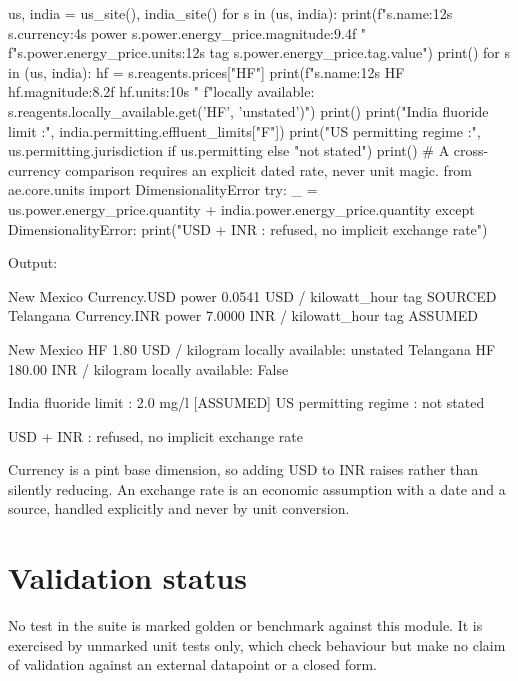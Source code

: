 \documentclass[10pt,a4paper,twoside]{report}
\begin{document}
\begin{doctestblock}
us, india = us_site(), india_site()
for s in (us, india):
    print(f"{s.name:12s} {s.currency:4s} power {s.power.energy_price.magnitude:9.4f} "
          f"{s.power.energy_price.units:12s} tag {s.power.energy_price.tag.value}")
print()
for s in (us, india):
    hf = s.reagents.prices["HF"]
    print(f"{s.name:12s} HF {hf.magnitude:8.2f} {hf.units:10s} "
          f"locally available: {s.reagents.locally_available.get('HF', 'unstated')}")
print()
print("India fluoride limit    :", india.permitting.effluent_limits["F"])
print("US permitting regime    :", us.permitting.jurisdiction if us.permitting else "not stated")
print()
# A cross-currency comparison requires an explicit dated rate, never unit magic.
from ae.core.units import DimensionalityError
try:
    _ = us.power.energy_price.quantity + india.power.energy_price.quantity
except DimensionalityError:
    print("USD + INR              : refused, no implicit exchange rate")
\end{doctestblock}

{\footnotesize\color{slate}Output:\par}

\begin{outputblock}
New Mexico   Currency.USD power    0.0541 USD / kilowatt_hour tag SOURCED
Telangana    Currency.INR power    7.0000 INR / kilowatt_hour tag ASSUMED

New Mexico   HF     1.80 USD / kilogram locally available: unstated
Telangana    HF   180.00 INR / kilogram locally available: False

India fluoride limit    : 2.0 mg/l [ASSUMED]
US permitting regime    : not stated

USD + INR              : refused, no implicit exchange rate
\end{outputblock}

Currency is a pint base dimension, so adding USD to INR raises rather than silently reducing. An exchange rate is an economic assumption with a date and a source, handled explicitly and never by unit conversion.

\section{Validation status}

No test in the suite is marked golden or benchmark against this module. It is exercised by unmarked unit tests only, which check behaviour but make no claim of validation against an external datapoint or a closed form.
\end{document}
